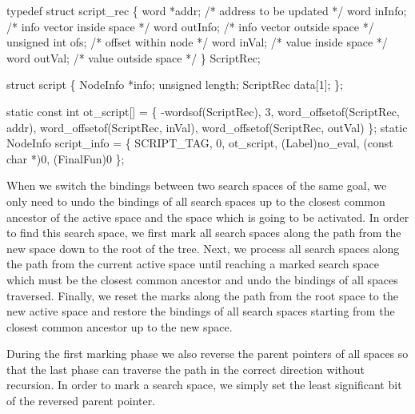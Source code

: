 \nwenddocs{}\plusendmoddef\nwstartdeflinemarkup{}\nwenddeflinemarkup
typedef struct script_rec \{
    word         *addr;         /* address to be updated */
    word         inInfo;        /* info vector inside space */
    word         outInfo;       /* info vector outside space */
    unsigned int ofs;           /* offset within node */
    word         inVal;         /* value inside space */
    word         outVal;        /* value outside space */
\} ScriptRec;

struct script \{
    NodeInfo  *info;
    unsigned  length;
    ScriptRec data[1];
\};

\nwendcode{}\nwdocspar
\nwenddocs{}\plusendmoddef\nwstartdeflinemarkup{}\nwenddeflinemarkup
static const int ot_script[] = \{
    -wordsof(ScriptRec), 3,
    word_offsetof(ScriptRec, addr),
    word_offsetof(ScriptRec, inVal),
    word_offsetof(ScriptRec, outVal)
\};
static NodeInfo script_info = \{
    SCRIPT_TAG, 0, ot_script, (Label)no_eval, (const char *)0, (FinalFun)0
\};

\nwendcode{}\nwdocspar
When we switch the bindings between two search spaces of the same
goal, we only need to undo the bindings of all search spaces up to the
closest common ancestor of the active space and the space which is
going to be activated. In order to find this search space, we first
mark all search spaces along the path from the new space down to the
root of the tree. Next, we process all search spaces along the path
from the current active space until reaching a marked search space
which must be the closest common ancestor and undo the bindings of all
spaces traversed. Finally, we reset the marks along the path from the
root space to the new active space and restore the bindings of all
search spaces starting from the closest common ancestor up to the new
space.

During the first marking phase we also reverse the parent pointers of
all spaces so that the last phase can traverse the path in the correct
direction without recursion. In order to mark a search space, we simply
set the least significant bit of the reversed parent pointer.

